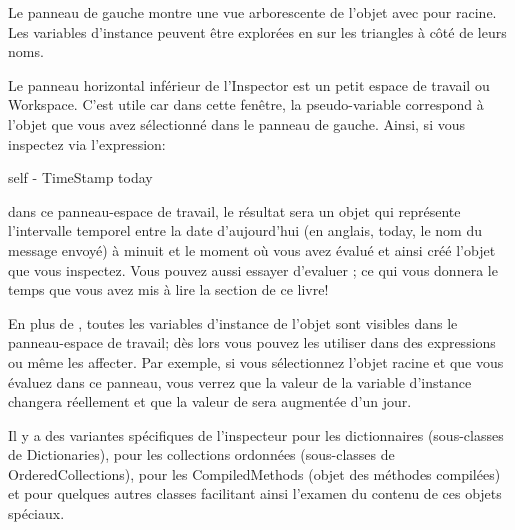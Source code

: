 \documentclass[a4paper,10pt,twoside]{book}
\begin{document}
Le panneau de gauche montre une vue arborescente de l'objet
avec \self{} pour racine. Les variables d'instance peuvent être
explorées en \clickant{} sur les triangles à côté de leurs noms.%


Le panneau horizontal inférieur de l'Inspector est un petit espace de
travail ou Workspace.
C'est utile car dans cette fenêtre, la pseudo-variable 
correspond à l'objet que vous avez sélectionné dans le panneau de gauche. 
Ainsi, si vous inspectez via  l'expression:
\begin{code}{}
self - TimeStamp today
\end{code}
dans ce panneau-espace de travail, le résultat sera un objet 
 qui représente l'intervalle temporel entre 
la date d'aujourd'hui (en anglais, today, le nom du message envoyé) à
minuit et le moment où vous avez évalué 
et ainsi créé l'objet  que vous inspectez.
Vous pouvez aussi essayer d'evaluer ; 
ce qui vous donnera le temps que vous avez mis à lire la section de ce livre!

En plus de , toutes les variables d'instance de l'objet sont
visibles dans le panneau-espace de travail; dès lors vous pouvez
les utiliser dans des expressions ou même les affecter.
Par exemple, si vous sélectionnez l'objet racine et que vous
évaluez  dans ce panneau,
vous verrez que la valeur de la variable d'instance  
changera réellement et que la valeur de  
sera augmentée d'un jour.


Il y a des variantes spécifiques de l'inspecteur pour les dictionnaires (sous-classes 
de Dictionaries), pour les collections ordonnées (sous-classes de OrderedCollections), 
pour les CompiledMethods (objet des méthodes compilées) et pour quelques autres classes 
facilitant ainsi l'examen du contenu de ces objets spéciaux.
\end{document}
